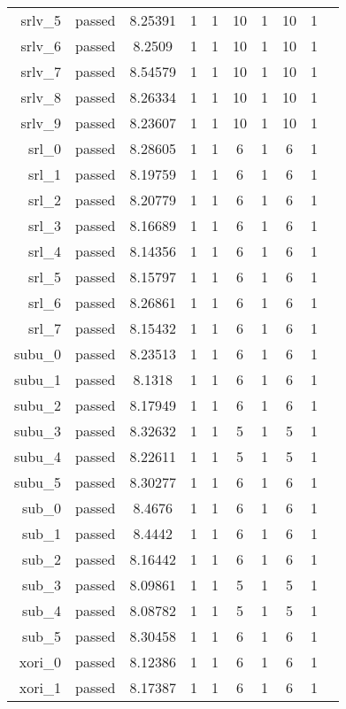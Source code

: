 \begin{longtable}{r|ccccccccc}
    srlv\_5 & passed & 8.25391 & 1 & 1 & 10 & 1 & 10 & 1 \\
    srlv\_6 & passed & 8.2509 & 1 & 1 & 10 & 1 & 10 & 1 \\
    srlv\_7 & passed & 8.54579 & 1 & 1 & 10 & 1 & 10 & 1 \\
    srlv\_8 & passed & 8.26334 & 1 & 1 & 10 & 1 & 10 & 1 \\
    srlv\_9 & passed & 8.23607 & 1 & 1 & 10 & 1 & 10 & 1 \\
    srl\_0 & passed & 8.28605 & 1 & 1 & 6 & 1 & 6 & 1 \\
    srl\_1 & passed & 8.19759 & 1 & 1 & 6 & 1 & 6 & 1 \\
    srl\_2 & passed & 8.20779 & 1 & 1 & 6 & 1 & 6 & 1 \\
    srl\_3 & passed & 8.16689 & 1 & 1 & 6 & 1 & 6 & 1 \\
    srl\_4 & passed & 8.14356 & 1 & 1 & 6 & 1 & 6 & 1 \\
    srl\_5 & passed & 8.15797 & 1 & 1 & 6 & 1 & 6 & 1 \\
    srl\_6 & passed & 8.26861 & 1 & 1 & 6 & 1 & 6 & 1 \\
    srl\_7 & passed & 8.15432 & 1 & 1 & 6 & 1 & 6 & 1 \\
    subu\_0 & passed & 8.23513 & 1 & 1 & 6 & 1 & 6 & 1 \\
    subu\_1 & passed & 8.1318 & 1 & 1 & 6 & 1 & 6 & 1 \\
    subu\_2 & passed & 8.17949 & 1 & 1 & 6 & 1 & 6 & 1 \\
    subu\_3 & passed & 8.32632 & 1 & 1 & 5 & 1 & 5 & 1 \\
    subu\_4 & passed & 8.22611 & 1 & 1 & 5 & 1 & 5 & 1 \\
    subu\_5 & passed & 8.30277 & 1 & 1 & 6 & 1 & 6 & 1 \\
    sub\_0 & passed & 8.4676 & 1 & 1 & 6 & 1 & 6 & 1 \\
    sub\_1 & passed & 8.4442 & 1 & 1 & 6 & 1 & 6 & 1 \\
    sub\_2 & passed & 8.16442 & 1 & 1 & 6 & 1 & 6 & 1 \\
    sub\_3 & passed & 8.09861 & 1 & 1 & 5 & 1 & 5 & 1 \\
    sub\_4 & passed & 8.08782 & 1 & 1 & 5 & 1 & 5 & 1 \\
    sub\_5 & passed & 8.30458 & 1 & 1 & 6 & 1 & 6 & 1 \\
    xori\_0 & passed & 8.12386 & 1 & 1 & 6 & 1 & 6 & 1 \\
    xori\_1 & passed & 8.17387 & 1 & 1 & 6 & 1 & 6 & 1 \\

\end{longtable}
